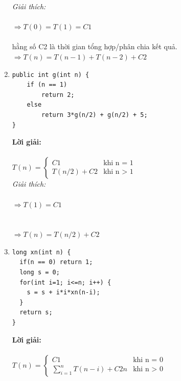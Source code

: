 \documentclass[12pt, letterpaper]{article}
\begin{document}
\begin{enumerate}
    \textit{Giải thích:} \\
     \\
    $\Rightarrow T(0) = T(1) = C1$ \\
     \\ 
    {hằng số C2 là thời gian tổng hợp/phân chia kết quả.} \\
    $\Rightarrow T(n) = T(n-1) + T(n-2) + C2$ \\

	\item \begin{lstlisting}
public int g(int n) {
    if (n == 1)
        return 2;
    else
        return 3*g(n/2) + g(n/2) + 5;
}
    \end{lstlisting}
    \textbf{Lời giải:} \\ \\
    $T(n) =
    \begin{cases}
    C1 &\text{khi n = 1} \\
    T(n/2) + C2 &\text{khi n > 1}
    \end{cases}$ \\

    \textit{Giải thích:} \\
     \\
    $\Rightarrow T(1) = C1$ \\
     \\ 
     \\
    $\Rightarrow T(n) = T(n/2) + C2$ \\

	\item \begin{lstlisting}
long xn(int n) {
  if(n == 0) return 1;
  long s = 0;
  for(int i=1; i<=n; i++) {
    s = s + i*i*xn(n-i);
  }
  return s;
}
	\end{lstlisting}
  \textbf{Lời giải:} \\ \\
  $T(n) =
  \begin{cases}
  C1 &\text{khi n = 0} \\
  \sum_{i=1}^{n} T(n-i) + C2n &\text{khi n > 0}
  \end{cases}$ \\


\end{enumerate}
\end{document}
